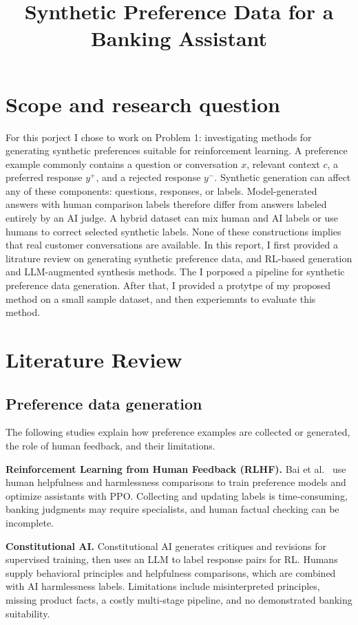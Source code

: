 \documentclass[11pt]{article}
\title{Synthetic Preference Data for a Banking Assistant}
\date{}
\begin{document}
\maketitle

\section{Scope and research question}
For this porject I chose to work on Problem 1: investigating methods for generating synthetic preferences suitable for reinforcement learning. A preference example commonly contains a question or conversation $x$, relevant context $c$, a preferred response $y^+$, and a rejected response $y^-$. Synthetic generation can affect any of these components: questions, responses, or labels. Model-generated answers with human comparison labels therefore differ from answers labeled entirely by an AI judge. A hybrid dataset can mix human and AI labels or use humans to correct selected synthetic labels. None of these constructions implies that real customer conversations are available.
In this report, I first provided a litrature review on generating synthetic preference data, and RL-based generation and LLM-augmented synthesis methods. The I porposed a pipeline for synthetic preference data generation. After that, I provided a protytpe of my proposed method on a small sample dataset, and then experiemnts to evaluate this method. 

\section{Literature Review}
\subsection{Preference data generation}
The following studies explain how preference examples are collected or generated, the role of human feedback, and their limitations.

\noindent\textbf{Reinforcement Learning from Human Feedback (RLHF).}
Bai et al.\ \cite{rlhf} use human helpfulness and harmlessness comparisons to train preference models and optimize assistants with PPO. Collecting and updating labels is time-consuming, banking judgments may require specialists, and human factual checking can be incomplete.

\noindent\textbf{Constitutional AI.}
Constitutional AI \cite{cai} generates critiques and revisions for supervised training, then uses an LLM to label response pairs for RL. Humans supply behavioral principles and helpfulness comparisons, which are combined with AI harmlessness labels. Limitations include misinterpreted principles, missing product facts, a costly multi-stage pipeline, and no demonstrated banking suitability.
\end{document}
